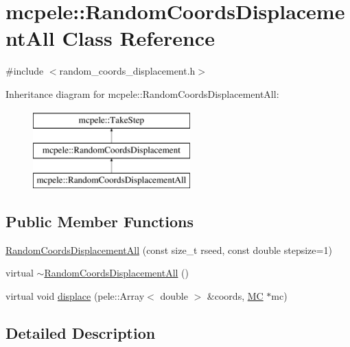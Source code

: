 \hypertarget{classmcpele_1_1RandomCoordsDisplacementAll}{\section{mcpele\-:\-:\-Random\-Coords\-Displacement\-All \-Class \-Reference}
\label{classmcpele_1_1RandomCoordsDisplacementAll}
}


{\ttfamily \#include $<$random\-\_\-coords\-\_\-displacement.\-h$>$}

\-Inheritance diagram for mcpele\-:\-:\-Random\-Coords\-Displacement\-All\-:\begin{figure}[H]
\begin{center}
\leavevmode
\includegraphics[height=3.000000cm]{classmcpele_1_1RandomCoordsDisplacementAll}
\end{center}
\end{figure}
\subsection*{\-Public \-Member \-Functions}
\begin{DoxyCompactItemize}
\item 
\hyperlink{classmcpele_1_1RandomCoordsDisplacementAll_aeddd85475bfd9fc2b0877259ce0fa6c8}{\-Random\-Coords\-Displacement\-All} (const size\-\_\-t rseed, const double stepsize=1)
\item 
virtual \hyperlink{classmcpele_1_1RandomCoordsDisplacementAll_ac80a8e168ea9f6e1f17d6462ce325492}{$\sim$\-Random\-Coords\-Displacement\-All} ()
\item 
virtual void \hyperlink{classmcpele_1_1RandomCoordsDisplacementAll_ab40ce59b2d74ffe3d8042c3e90268eab}{displace} (pele\-::\-Array$<$ double $>$ \&coords, \hyperlink{classmcpele_1_1MC}{\-M\-C} $\ast$mc)
\end{DoxyCompactItemize}


\subsection{\-Detailed \-Description}


